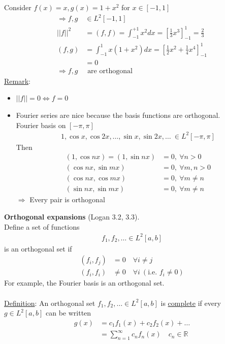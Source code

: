 \documentclass[12pt, letterpaper]{article}
\begin{document}
 Consider $f(x) = x, g(x) = 1+x^2$ for $x \in [-1,1]$
\begin{align*}
    \Rightarrow f,g &\in L^2[-1,1] \\
    ||f||^2 &= (f,f) = \int_{-1}^{+1}x^2dx = \left[\frac 13 x^3\right]^{1}_{-1} = \frac{2}{3} \\
    (f,g) &= \int_{-1}^{1}x(1+x^2)dx = \left[\frac 12 x^2 + \frac 14 x^4\right]^1_{-1} \\
    &= 0 \\
    \Rightarrow f,g &\text{ are orthogonal}
\end{align*}
\underline{Remark}:
\begin{itemize}
    \item $||f|| = 0 \Leftrightarrow f = 0$
    \item Fourier series are nice because the basis functions are orthogonal. \\
    Fourier basis on $[-\pi,\pi]$
    \begin{align*}
        1,\cos x, \cos 2x, \dots, \sin x, \sin 2x, \dots\ \in L^2[-\pi,\pi]
    \end{align*}
    Then 
    \begin{align*}
        (1,\cos nx) = (1,\sin nx) &= 0,\ \forall n > 0 \\
        (\cos nx, \sin mx) &= 0,\ \forall m,n > 0 \\
        (\cos nx, \cos mx) &= 0,\ \forall m\ne n \\
        (\sin nx, \sin mx) &= 0,\ \forall m\ne n
    \end{align*}
    $\Rightarrow$ Every pair is orthogonal
\end{itemize}
\textbf{Orthogonal expansions} (Logan 3.2, 3.3). \\
Define a set of functions 
\begin{align*}
    f_1, f_2,\dots \in L^2[a,b] 
\end{align*}
is an orthogonal set if 
\begin{align*}
    (f_i,f_j) &= 0 \quad \forall i\ne j \\
    (f_i,f_i) &\ne 0 \quad \forall i\ (\text{i.e. } f_i \ne 0)
\end{align*}
For example, the Fourier basis is an orthogonal set. \\ \\
\underline{Definition}: An orthogonal set $f_1,f_2,\dots \in L^2[a,b]$ is \underline{complete} if 
every $g \in L^2[a,b]$ can be written 
\begin{align*}
    g(x) &= c_1f_1(x) + c_2f_2(x) + \dots \\
    &= \sum_{n=1}^{\infty} c_n f_n(x) \quad c_n \in \mathbb{R} \
\end{align*}
\end{document}
